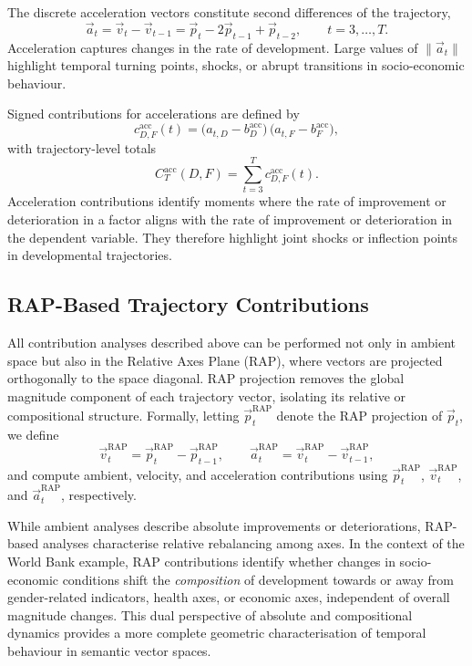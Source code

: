             The discrete acceleration vectors constitute second differences of the trajectory,
            \[
                \vec{a}_t = \vec{v}_t - \vec{v}_{t-1}
                         = \vec{p}_t - 2\vec{p}_{t-1} + \vec{p}_{t-2},
                \qquad t = 3,\ldots,T.
            \]
            Acceleration captures changes in the rate of development. Large values of $\|\vec{a}_t\|$ highlight temporal turning points, shocks, or abrupt transitions in socio-economic behaviour.

            Signed contributions for accelerations are defined by
            \[
                c^{\mathrm{acc}}_{D,F}(t)
                  = \big(a_{t,D} - b^{\mathrm{acc}}_D\big)\,\big(a_{t,F} - b^{\mathrm{acc}}_F\big),
            \]
            with trajectory-level totals
            \[
                C^{\mathrm{acc}}_T(D,F)
                  = \sum_{t=3}^{T} c^{\mathrm{acc}}_{D,F}(t).
            \]
            Acceleration contributions identify moments where the rate of improvement or deterioration in a factor aligns with the rate of improvement or deterioration in the dependent variable. They therefore highlight joint shocks or inflection points in developmental trajectories.

    \subsection{RAP-Based Trajectory Contributions}

        All contribution analyses described above can be performed not only in ambient space but also in the Relative Axes Plane (RAP), where vectors are projected orthogonally to the space diagonal. RAP projection removes the global magnitude component of each trajectory vector, isolating its relative or compositional structure. Formally, letting $\vec{p}^{\mathrm{RAP}}_t$ denote the RAP projection of $\vec{p}_t$, we define
        \[
            \vec{v}^{\mathrm{RAP}}_t = \vec{p}^{\mathrm{RAP}}_t - \vec{p}^{\mathrm{RAP}}_{t-1},
            \qquad
            \vec{a}^{\mathrm{RAP}}_t = \vec{v}^{\mathrm{RAP}}_t - \vec{v}^{\mathrm{RAP}}_{t-1},
        \]
        and compute ambient, velocity, and acceleration contributions using $\vec{p}^{\mathrm{RAP}}_t$, $\vec{v}^{\mathrm{RAP}}_t$, and $\vec{a}^{\mathrm{RAP}}_t$, respectively.

        While ambient analyses describe absolute improvements or deteriorations, RAP-based analyses characterise relative rebalancing among axes. In the context of the World Bank example, RAP contributions identify whether changes in socio-economic conditions shift the \emph{composition} of development towards or away from gender-related indicators, health axes, or economic axes, independent of overall magnitude changes. This dual perspective of absolute and compositional dynamics provides a more complete geometric characterisation of temporal behaviour in semantic vector spaces.

